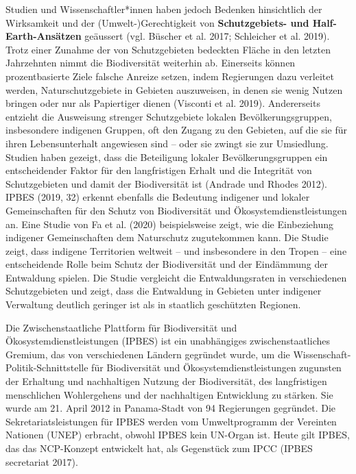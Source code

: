 \documentclass[
  nswissgerman,
  a4paper,
  DIV=11,
  numbers=noendperiod,
  oneside,
  openany]{scrreprt}
\begin{document}
Studien und Wissenschaftler*innen haben jedoch Bedenken hinsichtlich der
Wirksamkeit und der (Umwelt-)Gerechtigkeit von \textbf{Schutzgebiets-
und Half-Earth-Ansätzen} geäussert (vgl. Büscher et al. 2017; Schleicher
et al. 2019). Trotz einer Zunahme der von Schutzgebieten bedeckten
Fläche in den letzten Jahrzehnten nimmt die Biodiversität weiterhin ab.
Einerseits können prozentbasierte Ziele falsche Anreize setzen, indem
Regierungen dazu verleitet werden, Naturschutzgebiete in Gebieten
auszuweisen, in denen sie wenig Nutzen bringen oder nur als Papiertiger
dienen (Visconti et al. 2019). Andererseits entzieht die Ausweisung
strenger Schutzgebiete lokalen Bevölkerungsgruppen, insbesondere
indigenen Gruppen, oft den Zugang zu den Gebieten, auf die sie für ihren
Lebensunterhalt angewiesen sind -- oder sie zwingt sie zur Umsiedlung.
Studien haben gezeigt, dass die Beteiligung lokaler Bevölkerungsgruppen
ein entscheidender Faktor für den langfristigen Erhalt und die
Integrität von Schutzgebieten und damit der Biodiversität ist (Andrade
und Rhodes 2012). IPBES (2019, 32) erkennt ebenfalls die Bedeutung
indigener und lokaler Gemeinschaften für den Schutz von Biodiversität
und Ökosystemdienstleistungen an. Eine Studie von Fa et al. (2020)
beispielsweise zeigt, wie die Einbeziehung indigener Gemeinschaften dem
Naturschutz zugutekommen kann. Die Studie zeigt, dass indigene
Territorien weltweit -- und insbesondere in den Tropen -- eine
entscheidende Rolle beim Schutz der Biodiversität und der Eindämmung der
Entwaldung spielen. Die Studie vergleicht die Entwaldungsraten in
verschiedenen Schutzgebieten und zeigt, dass die Entwaldung in Gebieten
unter indigener Verwaltung deutlich geringer ist als in staatlich
geschützten Regionen.

\begin{tcolorbox}[enhanced jigsaw, arc=.35mm, bottomrule=.15mm, bottomtitle=1mm, breakable, colback=white, colbacktitle=quarto-callout-note-color!10!white, colframe=quarto-callout-note-color-frame, coltitle=black, left=2mm, leftrule=.75mm, opacityback=0, opacitybacktitle=0.6, rightrule=.15mm, title={Was ist IPBES?}, titlerule=0mm, toprule=.15mm, toptitle=1mm]

Die Zwischenstaatliche Plattform für Biodiversität und
Ökosystemdienstleistungen (IPBES) ist ein unabhängiges
zwischenstaatliches Gremium, das von verschiedenen Ländern gegründet
wurde, um die Wissenschaft-Politik-Schnittstelle für Biodiversität und
Ökosystemdienstleistungen zugunsten der Erhaltung und nachhaltigen
Nutzung der Biodiversität, des langfristigen menschlichen Wohlergehens
und der nachhaltigen Entwicklung zu stärken. Sie wurde am 21. April 2012
in Panama-Stadt von 94 Regierungen gegründet. Die Sekretariatsleistungen
für IPBES werden vom Umweltprogramm der Vereinten Nationen (UNEP)
erbracht, obwohl IPBES kein UN-Organ ist. Heute gilt IPBES, das das
NCP-Konzept entwickelt hat, als Gegenstück zum IPCC (IPBES secretariat
2017).

\end{tcolorbox}
\end{document}
